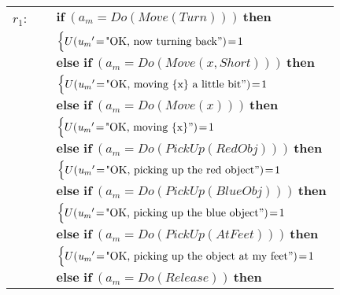 \begin{footnotesize}
\begin{longtable}{p{2cm}l}
$r_{1}$: \ \ & $ \textbf{if} \ (\mathit{a_m}\!=\!\mathit{Do(Move(Turn))}) \ \textbf{then} $ \\
 & \;\;\;\;\; $ \begin{cases}U(\mathit{u_m}'\!=\!\text{"OK, now turning back}")\!=\!1 \end{cases}$ \vspace{1mm} \\ & $ \textbf{else if} \ (\mathit{a_m}\!=\!\mathit{Do(Move({x},Short))}) \ \textbf{then}$ \\
& \;\;\;\;\; $ \begin{cases}U(\mathit{u_m}'\!=\!\text{"OK, moving \{x\} a little bit}")\!=\!1 \end{cases}$ \vspace{1mm} \\ & $ \textbf{else if} \ (\mathit{a_m}\!=\!\mathit{Do(Move({x}))}) \ \textbf{then}$ \\
& \;\;\;\;\; $ \begin{cases}U(\mathit{u_m}'\!=\!\text{"OK, moving \{x\}}")\!=\!1 \end{cases}$ \vspace{1mm} \\ & $ \textbf{else if} \ (\mathit{a_m}\!=\!\mathit{Do(PickUp(RedObj))}) \ \textbf{then}$ \\
& \;\;\;\;\; $ \begin{cases}U(\mathit{u_m}'\!=\!\text{"OK, picking up the red object}")\!=\!1 \end{cases}$ \vspace{1mm} \\ & $ \textbf{else if} \ (\mathit{a_m}\!=\!\mathit{Do(PickUp(BlueObj))}) \ \textbf{then}$ \\
& \;\;\;\;\; $ \begin{cases}U(\mathit{u_m}'\!=\!\text{"OK, picking up the blue object}")\!=\!1 \end{cases}$ \vspace{1mm} \\ & $ \textbf{else if} \ (\mathit{a_m}\!=\!\mathit{Do(PickUp(AtFeet))}) \ \textbf{then}$ \\
& \;\;\;\;\; $ \begin{cases}U(\mathit{u_m}'\!=\!\text{"OK, picking up the object at my feet}")\!=\!1 \end{cases}$ \vspace{1mm} \\ & $ \textbf{else if} \ (\mathit{a_m}\!=\!\mathit{Do(Release)}) \ \textbf{then}$ \\

\end{longtable}
\end{footnotesize}
